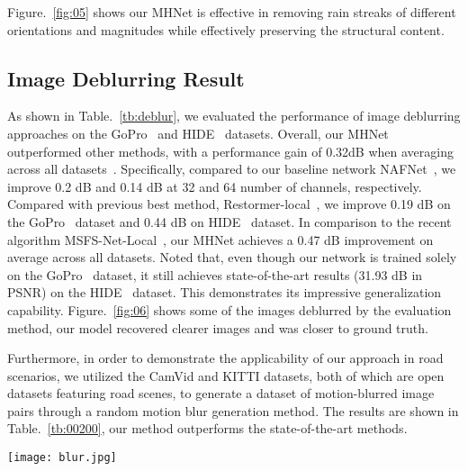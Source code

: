 \documentclass[lettersize,journal]{IEEEtran}
\begin{document}
Figure.~\ref{fig:05} shows our MHNet is effective in removing rain streaks of different orientations and magnitudes while effectively preserving the structural content. 




\subsection{Image Deblurring Result}
As  shown in Table.~\ref{tb:deblur}, we evaluated the performance of image deblurring approaches on the GoPro~\cite{Gopro} and HIDE~\cite{HIDE} datasets. Overall, our MHNet outperformed other methods, with a performance gain of 0.32dB when averaging across all datasets~\cite{Gopro,HIDE}. Specifically, compared to our baseline network NAFNet~\cite{chen2022simple}, we improve 0.2 dB and 0.14 dB at 32  and 64  number of channels, respectively.  Compared with previous best  method, Restormer-local~\cite{Zamir2021Restormer}, we improve 0.19 dB on the GoPro~\cite{Gopro} dataset and 0.44 dB on HIDE~\cite{HIDE} dataset. In comparison to the recent algorithm MSFS-Net-Local~\cite{MSFSnet}, our MHNet achieves a 0.47 dB improvement on average across all datasets. Noted that, even though our network is trained solely on the GoPro~\cite{Gopro} dataset, it still achieves state-of-the-art results (31.93 dB in PSNR) on the HIDE~\cite{HIDE} dataset. This demonstrates its impressive generalization capability. Figure.~\ref{fig:06} shows some of the images deblurred by the evaluation method, our model recovered clearer images and was closer to ground truth.

Furthermore, in order to demonstrate the applicability of our approach in road scenarios, we utilized the CamVid and KITTI datasets, both of which are open datasets featuring road scenes, to generate a dataset of motion-blurred image pairs through a random motion blur generation method. The results are shown in Table.~\ref{tb:00200}, our method outperforms the state-of-the-art methods.

\begin{figure*} \centerline{\texttt{[image: blur.jpg]}}
	\caption{\textbf{Image deblurring} example on the GoPro dataset~\cite{Gopro}. Compared to the state-of-the-art methods, our MHNet
restores sharper and perceptually-faithful images.}
	\label{fig:06}
\end{figure*}
\end{document}

